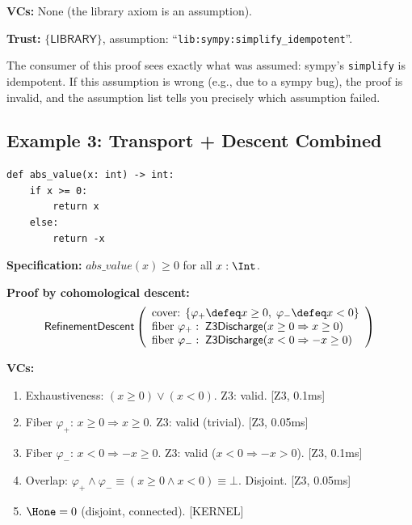 \textbf{VCs:} None (the library axiom is an assumption).

\textbf{Trust:} $\{\mathsf{LIBRARY}\}$, assumption:
``\texttt{lib:sympy:simplify\_idempotent}''.

The consumer of this proof sees exactly what was assumed:
sympy's \texttt{simplify} is idempotent.  If this assumption
is wrong (e.g., due to a sympy bug), the proof is invalid,
and the assumption list tells you precisely which assumption
failed.


\subsection{Example 3: Transport + Descent Combined}
\label{sec:ex-transport-descent}

\begin{lstlisting}
def abs_value(x: int) -> int:
    if x >= 0:
        return x
    else:
        return -x
\end{lstlisting}

\textbf{Specification:} $\mathit{abs\_value}(x) \geq 0$
for all $x : \Int$.

\textbf{Proof by cohomological descent:}
\[
  \mathsf{RefinementDescent}\left(
  \begin{array}{l}
    \text{cover: } \{\varphi_+ \defeq x \geq 0,\;
    \varphi_- \defeq x < 0\} \\
    \text{fiber } \varphi_+:\;
    \mathsf{Z3Discharge}(x \geq 0 \Rightarrow x \geq 0) \\
    \text{fiber } \varphi_-:\;
    \mathsf{Z3Discharge}(x < 0 \Rightarrow -x \geq 0)
  \end{array}\right)
\]

\textbf{VCs:}
\begin{enumerate}
\item Exhaustiveness: $(x \geq 0) \vee (x < 0)$.
  Z3: valid.  [\textsf{Z3}, 0.1ms]
\item Fiber $\varphi_+$: $x \geq 0 \Rightarrow x \geq 0$.
  Z3: valid (trivial).  [\textsf{Z3}, 0.05ms]
\item Fiber $\varphi_-$: $x < 0 \Rightarrow -x \geq 0$.
  Z3: valid ($x < 0 \Rightarrow -x > 0$).  [\textsf{Z3}, 0.1ms]
\item Overlap: $\varphi_+ \wedge \varphi_- \equiv (x \geq 0 \wedge x < 0)
  \equiv \bot$.  Disjoint.  [\textsf{Z3}, 0.05ms]
\item $\Hone = 0$ (disjoint, connected).  [\textsf{KERNEL}]
\end{enumerate}

